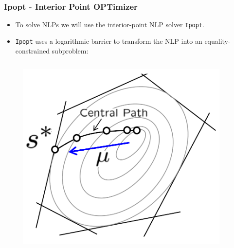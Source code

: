 \begin{frame}[t]
    \frametitle{Ipopt - Interior Point OPTimizer}
    \begin{footnotesize}
    \begin{itemize}
      \item To solve NLPs we will use the interior-point NLP solver {\tt Ipopt}.
      \item {\tt Ipopt} uses a logarithmic barrier to transform the NLP into an equality-constrained subproblem:
    \end{itemize}
    \end{footnotesize}
    \vspace{-0.5cm}
    \begin{columns}
      \begin{figure}[h]
        \centering
        \includegraphics[scale=0.1]{interior_point.png}
      \end{figure}
      \begin{footnotesize}
        \end{footnotesize}
      \end{columns}

\end{frame}
